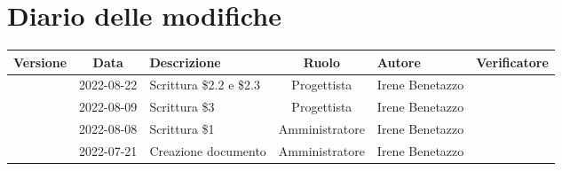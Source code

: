 \section*{Diario delle modifiche}
	\begin{center}
	\renewcommand{\arraystretch}{1.8} %
	\begin{longtable}{ |c|c|p{8em}|c|m{5em}|m{6em}| }
	\hline
	\textbf{Versione} & \textbf{Data} & \textbf{Descrizione} &  \textbf{Ruolo} &  \textbf{Autore} & \textbf{Verificatore}\\ %
	\hline %
	& 2022-08-22 & Scrittura \$2.2 e \$2.3 & Progettista & Irene \newline Benetazzo & \\ 
	\hline
    & 2022-08-09 & Scrittura \$3 & Progettista & Irene \newline Benetazzo & \\ 
	\hline
	& 2022-08-08 & Scrittura \$1 & Amministratore & Irene \newline Benetazzo & \\ 
	\hline
	& 2022-07-21 & Creazione documento & Amministratore & Irene \newline Benetazzo & \\ 
	\hline
	\end{longtable}
	\end{center}
	\newpage